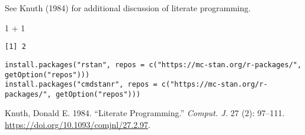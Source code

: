 \documentclass[
  letterpaper,
  DIV=11,
  numbers=noendperiod]{scrreprt}
\newenvironment{Shaded}{\begin{snugshade}}{\end{snugshade}}
\newcommand{\DecValTok}[1]{\textcolor[rgb]{0.68,0.00,0.00}{#1}}
\newcommand{\SpecialCharTok}[1]{\textcolor[rgb]{0.37,0.37,0.37}{#1}}
\newlength{\cslhangindent}
\newlength{\cslentryspacingunit} %
\newenvironment{CSLReferences}[2] %
 {%
  \setlength{\parindent}{0pt}
  \ifodd #1
  \let\oldpar\par
  \def\par{\hangindent=\cslhangindent\oldpar}
  \fi
  \setlength{\parskip}{#2\cslentryspacingunit}
 }%
 {}
\begin{document}
See Knuth (1984) for additional discussion of literate programming.

\begin{Shaded}
\begin{Highlighting}[]
\DecValTok{1} \SpecialCharTok{+} \DecValTok{1}
\end{Highlighting}
\end{Shaded}

\begin{verbatim}
[1] 2
\end{verbatim}

\begin{verbatim}
install.packages("rstan", repos = c("https://mc-stan.org/r-packages/", getOption("repos")))
install.packages("cmdstanr", repos = c("https://mc-stan.org/r-packages/", getOption("repos")))
\end{verbatim}

\hypertarget{refs}{}
\begin{CSLReferences}{1}{0}
\leavevmode{}%
Knuth, Donald E. 1984. {``Literate Programming.''} \emph{Comput. J.} 27
(2): 97--111. \url{https://doi.org/10.1093/comjnl/27.2.97}.

\end{CSLReferences}
\end{document}
